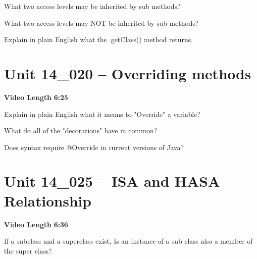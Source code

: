 \documentclass[letterpaper,12pt]{exam}
\newcommand{\unit}{Unit 14}
\begin{document}
\begin{questions}
\begin{samepage}
    \question What two access levels may be inherited by sub methods?
    \vspace{5mm}
\end{samepage}
\begin{samepage}
    \question What two access levels may NOT be inherited by sub methods?
    \vspace{5mm}
\end{samepage}

\begin{samepage}
    \question Explain in plain English what the .getClass() method returns.
    \vspace{5mm}
\end{samepage}


\section*{\unit\_020 -- Overriding methods } 
\par{\selectfont\textbf{Video Length 6:25}}

\begin{samepage}
    \question Explain in plain English what it means to "Override" a variable?
    \vspace{5mm}
\end{samepage}

\begin{samepage}
    \question What do all of the "decorations" have in common?
    \vspace{5mm}
\end{samepage}

\begin{samepage}
    \question Does syntax require @Override in current versions of Java?
    \vspace{5mm}
\end{samepage}




\section*{\unit\_025 -- ISA and HASA Relationship } 
\par{\selectfont\textbf{Video Length 6:36}}

\begin{samepage}
    \question If a subclass and a superclass exist, Is an instance of a sub class also a member of the super class?
    \vspace{5mm}
\end{samepage}


\end{questions}
\end{document}
